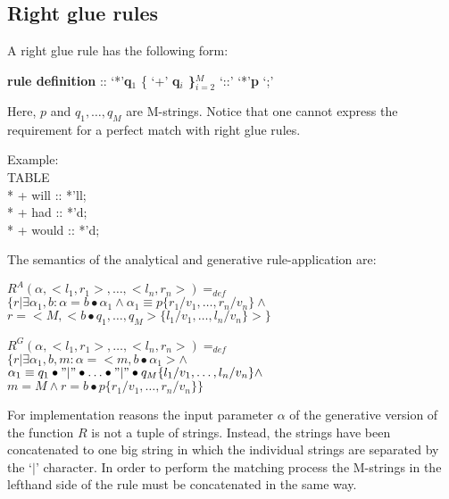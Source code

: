 \subsection{Right glue rules }
A right glue rule has the following form:
\small
\begin{code}
{\bf rule definition } :: `*'{\bf q$_{1}$} \{ `+' {\bf q$_{i}$ \}$_{i=2}^{M}$} `::' `*'{\bf p} `;' \\
\end{code}
\normalsize
Here, $p$ and $q_{1},\ldots,q_{M}$ are M-strings. Notice that one cannot
express the requirement for a perfect match with right glue rules.

\small
\begin{code}
Example: \\
\>TABLE\\
\>\>* + will  :: *'ll;\\
\>\>* + had   :: *'d;\\
\>\>* + would :: *'d;\\
\end{code}
\normalsize

The semantics of
the analytical and generative rule-application are:
\small
\begin{code}
$R^{A}(\alpha,<l_{1},r_{1}>, \ldots ,<l_{n},r_{n}>) =_{def}$\\
\>$\{ r | \exists \alpha_{1}, b : \alpha = b\bullet\alpha_{1} \wedge \alpha_{1} \equiv p\{r_{1}/v_{1},\ldots,r_{n}/v_{n}\} \wedge$\\
\>$r = <M, <b\bullet q_{1},\ldots,q_{M}>\{l_{1}/v_{1},\ldots,l_{n}/v_{n}\}> \}$\\
\end{code}
\normalsize
\small
\begin{code}
$R^{G}(\alpha,<l_{1},r_{1}>, \ldots ,<l_{n},r_{n}>) =_{def}$\\
\>$\{ r | \exists \alpha_{1}, b, m : \alpha = <m, b\bullet\alpha_{1}> \wedge $\\
\>$\alpha_{1} \equiv q_{1}\bullet"|"\bullet\ldots\bullet "|"\bullet q_{M}\{l_{1}/v_{1},\ldots,l_{n}/v_{n}\} \wedge$\\
\>$m = M \wedge r = b\bullet p\{r_{1}/v_{1},\ldots,r_{n}/v_{n}\} \}$\\
\end{code}
\normalsize
For implementation reasons the input parameter $\alpha$ of the generative version of
the function $R$ is not a tuple of strings. Instead, the strings have
been concatenated to one big string in which the individual strings are
separated by the `$|$' character.  In order to perform the matching process
the M-strings in the lefthand side of the rule must be concatenated in the
same way.

